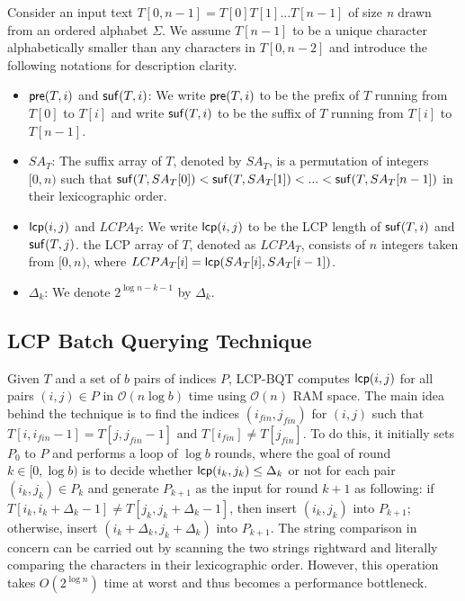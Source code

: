 \documentclass{llncs}
\begin{document}
Consider an input text $T[0,n-1] =T[0]T[1]...T[n-1]$ of size {\em n} drawn from an ordered alphabet $\Sigma$. We assume $T[n-1]$ to be a unique character alphabetically smaller than any characters in $T[0,n-2]$ and introduce the following notations for description clarity.

\begin{itemize}
\item ${\sf pre}(T,i)$ and ${\sf suf}(T,i)$: We write ${\sf pre}(T,i)$ to be the prefix of $T$ running from $T[0]$ to $T[i]$ and write ${\sf suf}(T,i)$ to be the suffix of $T$ running from $T[i]$ to $T[n-1]$.
\item  $SA_T$:  The suffix array of $T$, denoted by $SA_T$, is a permutation of integers $[0,n)$ such that ${\sf suf}(T,SA_T[0])<{\sf suf}(T,SA_T[1])<...<{\sf suf}(T,SA_T[n-1])$ in their lexicographic order.
\item ${\sf lcp}(i,j)$ and $LCPA_T$: We write ${\sf lcp}(i,j)$ to be the {LCP} length of ${\sf suf}(T,i)$ and ${\sf suf}(T,j)$. the {LCP} array of $T$, denoted as $LCPA_T$, consists of $n$ integers taken from $[0,n)$, where $LCPA_T[i]= {\sf lcp}(SA_T[i],SA_T[i-1])$.
\item $\Delta_{k}$: We denote $2^{\log n - k - 1}$ by $\Delta_{k}$.
\end{itemize}

\subsection{LCP Batch Querying Technique}\label{subsec:lcp_batch_querying_technique}

Given $T$ and a set of $b$ pairs of indices $P$, {LCP-BQT} computes ${\sf lcp}(i,j)$ for all pairs $(i,j)\in P$ in $\mathcal{O}(n\log b)$ time using $\mathcal{O}(n)$ {RAM} space. The main idea behind the technique is to find the indices $(i_{fin}, j_{fin})$ for $(i,j)$ such that $T[i,i_{fin}-1]=T[j,j_{fin}-1]$ and $T[i_{fin}] \neq T[j_{fin}]$. To do this, it initially sets $P_0$ to $P$ and performs a loop of $\log b$ rounds, where the goal of round $k\in [0,\log b)$ is to decide whether ${\sf lcp}(i_k,j_k) \le \Delta_k$ or not for each pair $(i_k,j_k)\in P_k$ and generate $P_{k+1}$ as the input for round $k+1$ as following: if $T[i_k,i_k+\Delta_k-1] \neq T[j_k,j_k+\Delta_k-1]$, then insert $(i_k,j_k)$ into $P_{k+1}$; otherwise, insert $(i_k+\Delta_k,j_k+\Delta_k)$ into $P_{k+1}$. The string comparison in concern can be carried out by scanning the two strings rightward and literally comparing the characters in their lexicographic order. However, this operation takes $O(2^{\log n})$ time at worst and thus becomes a performance bottleneck.
\end{document}
